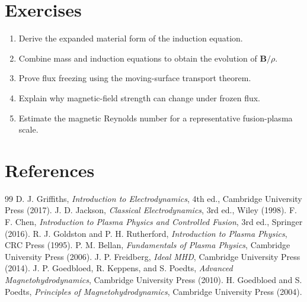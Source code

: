 \documentclass[11pt]{article}
\begin{document}
\section{Exercises}
\begin{enumerate}[leftmargin=1.8em]
\item Derive the expanded material form of the induction equation.
\item Combine mass and induction equations to obtain the evolution of $\mathbf B/\rho$.
\item Prove flux freezing using the moving-surface transport theorem.
\item Explain why magnetic-field strength can change under frozen flux.
\item Estimate the magnetic Reynolds number for a representative fusion-plasma scale.
\end{enumerate}

\section{References}
\begin{thebibliography}{99}
 D. J. Griffiths, \emph{Introduction to Electrodynamics}, 4th ed., Cambridge University Press (2017).
 J. D. Jackson, \emph{Classical Electrodynamics}, 3rd ed., Wiley (1998).
 F. F. Chen, \emph{Introduction to Plasma Physics and Controlled Fusion}, 3rd ed., Springer (2016).
 R. J. Goldston and P. H. Rutherford, \emph{Introduction to Plasma Physics}, CRC Press (1995).
 P. M. Bellan, \emph{Fundamentals of Plasma Physics}, Cambridge University Press (2006).
 J. P. Freidberg, \emph{Ideal MHD}, Cambridge University Press (2014).
 J. P. Goedbloed, R. Keppens, and S. Poedts, \emph{Advanced Magnetohydrodynamics}, Cambridge University Press (2010).
 H. Goedbloed and S. Poedts, \emph{Principles of Magnetohydrodynamics}, Cambridge University Press (2004).
\end{thebibliography}
\end{document}
